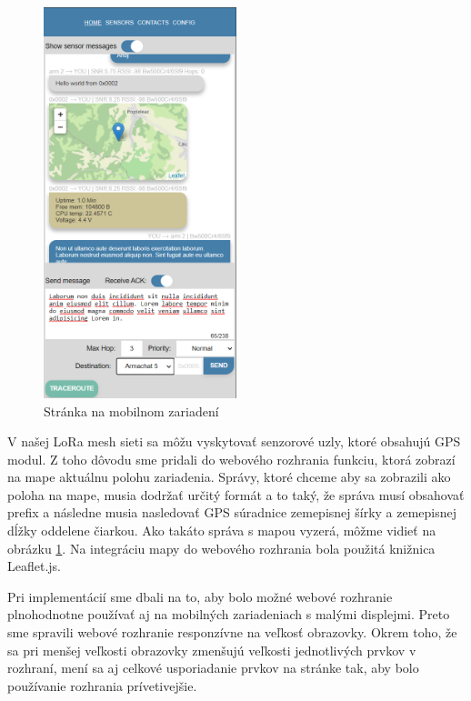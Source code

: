 \documentclass[slovak,master]{diploma}
\begin{document}
\begin{figure}
  \begin{center}
    \includegraphics[width=0.5\textwidth]{Figures/mobileWeb.png}
  \end{center}
  \caption{Stránka na mobilnom zariadení}
  \label{fig:mobileWeb}
\end{figure}

V našej LoRa mesh sieti sa môžu vyskytovať senzorové uzly, ktoré obsahujú GPS modul. Z toho dôvodu sme pridali do webového rozhrania funkciu, 
ktorá zobrazí na mape aktuálnu polohu zariadenia. Správy, ktoré chceme aby sa zobrazili ako poloha na mape, musia dodržať určitý formát 
a to taký, že správa musí obsahovať prefix  a následne musia nasledovať GPS súradnice zemepisnej šírky a zemepisnej dĺžky oddelene čiarkou.
Ako takáto správa s mapou vyzerá, môžme vidieť na obrázku \ref{fig:mobileWeb}. Na integráciu mapy do webového rozhrania bola použitá knižnica Leaflet.js\footnotemark[1].

Pri implementácií sme dbali na to, aby bolo možné webové rozhranie plnohodnotne používať aj na mobilných zariadeniach s malými displejmi. Preto sme 
spravili webové rozhranie responzívne na veľkosť obrazovky. Okrem toho, že sa pri menšej veľkosti obrazovky zmenšujú veľkosti jednotlivých prvkov v rozhraní, 
mení sa aj celkové usporiadanie prvkov na stránke tak, aby bolo používanie rozhrania prívetivejšie. 
\end{document}
